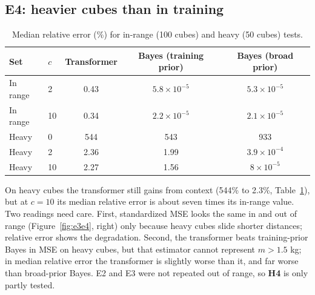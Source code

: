 \documentclass{article}
\begin{document}
\subsection{E4: heavier cubes than in training}
\begin{table}[t]
\centering\small
\caption{Median relative error (\%) for in-range (100 cubes) and heavy (50 cubes) tests.}
\label{tab:e4}
\begin{tabular}{llccc}
\toprule
Set & $c$ & Transformer & Bayes (training prior) & Bayes (broad prior)\\
\midrule
In range & 2 & 0.43 & $5.8\times10^{-5}$ & $5.3\times10^{-5}$\\
In range & 10 & 0.34 & $2.2\times10^{-5}$ & $2.1\times10^{-5}$\\
Heavy & 0 & 544 & 543 & 933\\
Heavy & 2 & 2.36 & 1.99 & $3.9\times10^{-4}$\\
Heavy & 10 & 2.27 & 1.56 & $8\times10^{-5}$\\
\bottomrule
\end{tabular}
\end{table}
On heavy cubes the transformer still gains from context (544\% to 2.3\%, Table~\ref{tab:e4}), but at $c=10$ its median relative error is about seven times its in-range value. Two readings need care. First, standardized MSE looks the same in and out of range (Figure~\ref{fig:e3e4}, right) only because heavy cubes slide shorter distances; relative error shows the degradation. Second, the transformer beats training-prior Bayes in MSE on heavy cubes, but that estimator cannot represent $m>1.5$ kg; in median relative error the transformer is slightly worse than it, and far worse than broad-prior Bayes. E2 and E3 were not repeated out of range, so \textbf{H4} is only partly tested.
\end{document}
